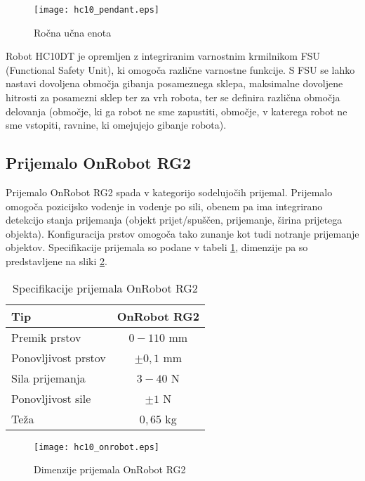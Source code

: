 \begin{figure}[!hbt]
	\centering
	\texttt{[image: hc10\_pendant.eps]}
	\caption{Ročna učna enota}
	\label{fig:hc10_pendant}
\end{figure}

Robot HC10DT je opremljen z integriranim varnostnim krmilnikom FSU (Functional Safety Unit), ki omogoča različne varnostne funkcije. S FSU se lahko nastavi dovoljena območja gibanja posameznega sklepa, maksimalne dovoljene hitrosti za posamezni sklep ter za vrh robota, ter se definira različna območja delovanja (območje, ki ga robot ne sme zapustiti, območje, v katerega robot ne sme vstopiti, ravnine, ki omejujejo gibanje robota).




\subsection{Prijemalo OnRobot RG2}

Prijemalo OnRobot RG2 spada v kategorijo sodelujočih prijemal. Prijemalo omogoča pozicijsko vodenje in vodenje po sili, obenem pa ima integrirano detekcijo stanja prijemanja (objekt prijet/spuščen, prijemanje, širina prijetega objekta). Konfiguracija prstov omogoča tako zunanje kot tudi notranje prijemanje objektov. Specifikacije prijemala so podane v tabeli \ref{tab:RG2}, dimenzije pa so predstavljene na sliki \ref{fig:hc10_onrobot}.

\begin{table}
	\centering
	\caption{Specifikacije prijemala OnRobot RG2}
	\label{tab:RG2}
	\begin{tabular}{|l|c|}
		\hline Tip                  & OnRobot RG2 \\
		\hline Premik prstov        & $0-110$ mm \\
		\hline Ponovljivost prstov   & $\pm 0,1$ mm \\
		\hline Sila prijemanja      & $3-40$ N \\
		\hline Ponovljivost sile    & $\pm 1$ N \\
		\hline Teža                 & $0,65$ kg \\
		\hline
	\end{tabular}
\end{table}


\begin{figure}[!hbt]
	\centering
	\texttt{[image: hc10\_onrobot.eps]}
	\caption{Dimenzije prijemala OnRobot RG2}
	\label{fig:hc10_onrobot}
\end{figure}


